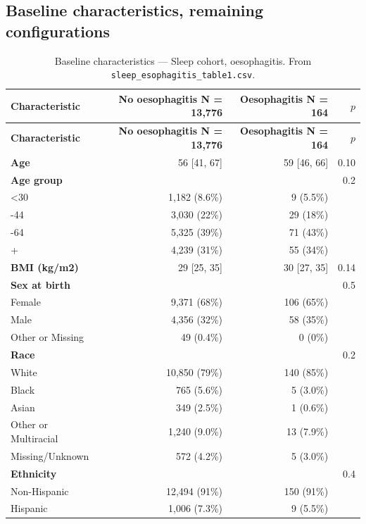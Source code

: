 \documentclass[11pt]{article}
\newcommand{\code}[1]{\texttt{\small #1}}
\begin{document}
\subsection{Baseline characteristics, remaining configurations}
\footnotesize\begin{longtable}{@{}p{6.4cm}rrr@{}}
\caption{Baseline characteristics --- Sleep cohort, oesophagitis. From \code{sleep\_esophagitis\_table1.csv}.}\label{tab:appM-t1-sleep-esophagitis}\\
\toprule \textbf{Characteristic} & \textbf{No oesophagitis     N = 13,776} & \textbf{Oesophagitis     N = 164} & \textbf{$p$} \\ \midrule \endfirsthead
\toprule \textbf{Characteristic} & \textbf{No oesophagitis     N = 13,776} & \textbf{Oesophagitis     N = 164} & \textbf{$p$} \\ \midrule \endhead
\textbf{Age} & 56 [41, 67] & 59 [46, 66] & 0.10 \\
\textbf{Age group} &  &  & 0.2 \\
\quad <30 & 1,182 (8.6\%) & 9 (5.5\%) &  \\
\quad 30-44 & 3,030 (22\%) & 29 (18\%) &  \\
\quad 45-64 & 5,325 (39\%) & 71 (43\%) &  \\
\quad 65+ & 4,239 (31\%) & 55 (34\%) &  \\
\textbf{BMI (kg/m2)} & 29 [25, 35] & 30 [27, 35] & 0.14 \\
\textbf{Sex at birth} &  &  & 0.5 \\
\quad Female & 9,371 (68\%) & 106 (65\%) &  \\
\quad Male & 4,356 (32\%) & 58 (35\%) &  \\
\quad Other or Missing & 49 (0.4\%) & 0 (0\%) &  \\
\textbf{Race} &  &  & 0.2 \\
\quad White & 10,850 (79\%) & 140 (85\%) &  \\
\quad Black & 765 (5.6\%) & 5 (3.0\%) &  \\
\quad Asian & 349 (2.5\%) & 1 (0.6\%) &  \\
\quad Other or Multiracial & 1,240 (9.0\%) & 13 (7.9\%) &  \\
\quad Missing/Unknown & 572 (4.2\%) & 5 (3.0\%) &  \\
\textbf{Ethnicity} &  &  & 0.4 \\
\quad Non-Hispanic & 12,494 (91\%) & 150 (91\%) &  \\
\quad Hispanic & 1,006 (7.3\%) & 9 (5.5\%) &  \\

\end{longtable}
\end{document}
